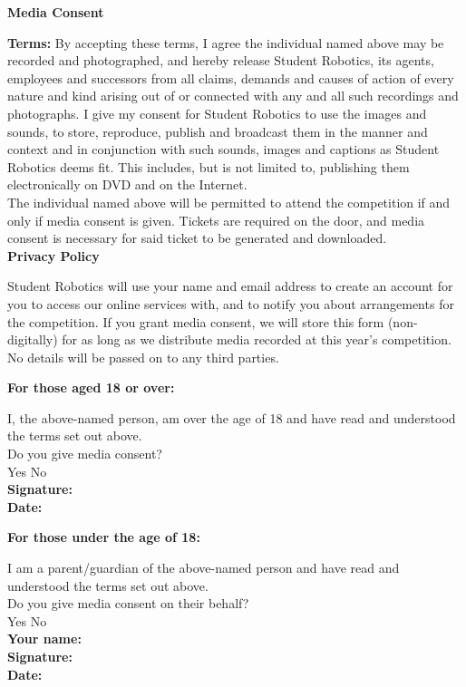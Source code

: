 \documentclass[a4paper,12pt]{article}
\newcommand{\checkbox}[1]{#1\hspace{0.2cm}\raisebox{-0.3mm}{$\square$}}
\newcommand{\textfield}[1]{\textbf{#1:} \hrulefill\hspace{0mm}}
\newcommand{\fieldsep}{\\[2.5mm]}
\begin{document}
\textbf{\large Media Consent}\\\vspace{-3mm}

\textbf{Terms:} By accepting these terms, I agree the individual named above may be recorded and photographed, and hereby release Student Robotics, its agents, employees and successors from all claims, demands and causes of action of every nature and kind arising out of or connected with any and all such recordings and photographs.
I give my consent for Student Robotics to use the images and sounds, to store, reproduce, publish and broadcast them in the manner and context and in conjunction with such sounds, images and captions as Student Robotics deems fit.
This includes, but is not limited to, publishing them electronically on DVD and on the Internet.\\

The individual named above will be permitted to attend the competition if and only if media consent is given.
Tickets are required on the door, and media consent is necessary for said ticket to be generated and downloaded.\\


\textbf{\large Privacy Policy}\\\vspace{-3mm}

Student Robotics will use your name and email address to create an account for you to access our online services with, and to notify you about arrangements for the competition.
If you grant media consent, we will store this form (non-digitally) for as long as we distribute media recorded at this year's competition.
No details will be passed on to any third parties. \\

\begin{minipage}[t]{0.48\textwidth}
\textbf{For those aged 18 or over:}

I, the above-named person, am over the age of 18 and have read and understood the terms set out above.\\

Do you give media consent? \\[2mm]
\checkbox{Yes} \hspace{1cm} \checkbox{No}\\

\textfield{Signature} \fieldsep
\textfield{Date}
\end{minipage}
\hspace{0.02\textwidth}
\begin{minipage}[t]{0.48\textwidth}
\textbf{For those under the age of 18:}

I am a parent/guardian of the above-named person and have read and understood the terms set out above.\\

Do you give media consent on their behalf?\\[2mm]
\checkbox{Yes} \hspace{1cm} \checkbox{No}\\

\textfield{Your name} \fieldsep
\textfield{Signature} \fieldsep
\textfield{Date}
\end{minipage}
\end{document}
